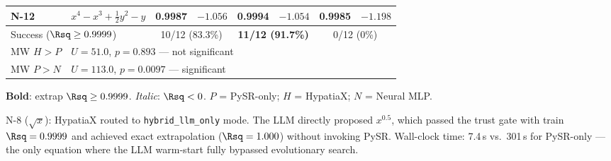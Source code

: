 \begin{table}[h]
\begin{threeparttable}
\begin{tabular}{llrrrrrr}
N-12 & $x^4 - x^3 + \tfrac{1}{2}y^2 - y$
  & 0.9987 & $-1.056$
  & 0.9994 & $-1.054$
  & 0.9985 & $-1.198$ \\
\midrule
\multicolumn{2}{l}{Success ($\Rsq\ge0.9999$)}
  & \multicolumn{2}{c}{10/12 (83.3\%)}
  & \multicolumn{2}{c}{\textbf{11/12 (91.7\%)}}
  & \multicolumn{2}{c}{0/12 (0\%)} \\
MW $H>P$   & \multicolumn{7}{l}{$U=51.0$, $p=0.893$ — not significant} \\
MW $P>N$   & \multicolumn{7}{l}{$U=113.0$, $p=0.0097$ — significant} \\
\bottomrule
\end{tabular}
\begin{tablenotes}\small
  \item \textbf{Bold}: extrap $\Rsq \ge 0.9999$. \emph{Italic}: $\Rsq < 0$.
    $P$ = PySR-only; $H$ = HypatiaX; $N$ = Neural MLP.
  \item[$\dag$] N-8 ($\sqrt{x}$): HypatiaX routed to \texttt{hybrid\_llm\_only} mode.
    The LLM directly proposed $x^{0.5}$, which passed the trust gate with
    train $\Rsq = 0.9999$ and achieved exact extrapolation ($\Rsq = 1.000$)
    without invoking PySR. Wall-clock time: 7.4\,s vs.\ 301\,s for PySR-only ---
    the only equation where the LLM warm-start fully bypassed evolutionary search.
\end{tablenotes}
\end{threeparttable}
\end{table}
